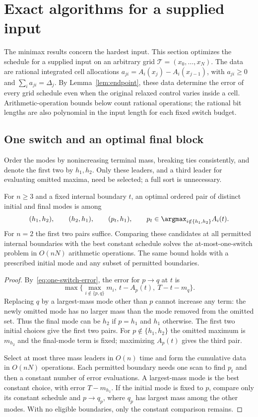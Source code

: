 \section{Exact algorithms for a supplied input}\label{sec:algorithms}

The minimax results concern the hardest input. This section optimizes the
schedule for a supplied input on an arbitrary grid
$\mathcal T=(x_0,\ldots,x_N)$.
The data are rational integrated cell allocations
$a_{ji}=A_i(x_j)-A_i(x_{j-1})$, with $a_{ji}\ge0$ and
$\sum_i a_{ji}=\Delta_j$. By Lemma~\ref{lem:endpoint}, these data determine
the error of every grid schedule even when the original relaxed control
varies inside a cell. Arithmetic-operation bounds below count rational
operations; the rational bit lengths are also polynomial in the input length
for each fixed switch budget.

\subsection{One switch and an optimal final block}

Order the modes by nonincreasing terminal mass, breaking ties consistently,
and denote the first two by $h_1,h_2$. Only these leaders, and a third leader
for evaluating omitted maxima, need be selected; a full sort is unnecessary.

\begin{theorem}\label{thm:linear-one-switch}
For $n\ge3$ and a fixed internal boundary $t$, an optimal ordered pair of
distinct initial and final modes is among
\[
 (h_1,h_2),\qquad(h_2,h_1),\qquad(p_t,h_1),
 \qquad p_t\in\argmax_{i\notin\{h_1,h_2\}}A_i(t).
\]
For $n=2$ the first two pairs suffice. Comparing these candidates at all
permitted internal boundaries with the best constant schedule solves the
at-most-one-switch problem in $O(nN)$ arithmetic operations. The same bound
holds with a prescribed initial mode and any subset of permitted boundaries.
\end{theorem}
\begin{proof}
By~\eqref{eq:one-switch-error}, the error for $p\to q$ at $t$ is
\[
 \max\{\max_{i\notin\{p,q\}}m_i,\ t-A_p(t),\ T-t-m_q\}.
\]
Replacing $q$ by a largest-mass mode other than $p$ cannot increase any
term: the newly omitted mode has no larger mass than the mode removed from
the omitted set. Thus the final mode can be $h_2$ if $p=h_1$ and $h_1$
otherwise. The first two initial choices give the first two pairs. For
$p\notin\{h_1,h_2\}$ the omitted maximum is $m_{h_2}$ and the final-mode
term is fixed; maximizing $A_p(t)$ gives the third pair.

Select at most three mass leaders in $O(n)$ time and form the cumulative
data in $O(nN)$ operations. Each permitted boundary needs one scan to find
$p_t$ and then a constant number of error evaluations. A largest-mass mode
is the best constant choice, with error $T-m_{h_1}$. If the initial mode is
fixed to $p$, compare only its constant schedule and $p\to q_p$, where
$q_p$ has largest mass among the other modes. With no eligible boundaries,
only the constant comparison remains.
\end{proof}

